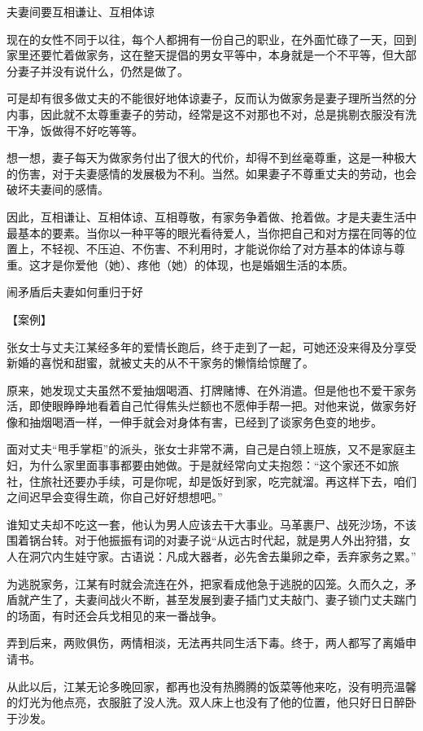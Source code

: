\documentclass[12pt,UTF8]{ctexbook}
\begin{document}
夫妻间要互相谦让、互相体谅


现在的女性不同于以往，每个人都拥有一份自己的职业，在外面忙碌了一天，回到家里还要忙着做家务，这在整天提倡的男女平等中，本身就是一个不平等，但大部分妻子并没有说什么，仍然是做了。

可是却有很多做丈夫的不能很好地体谅妻子，反而认为做家务是妻子理所当然的分内事，因此就不太尊重妻子的劳动，经常是这不对那也不对，总是挑剔衣服没有洗干净，饭做得不好吃等等。

想一想，妻子每天为做家务付出了很大的代价，却得不到丝毫尊重，这是一种极大的伤害，对于夫妻感情的发展极为不利。当然。如果妻子不尊重丈夫的劳动，也会破坏夫妻间的感情。

因此，互相谦让、互相体谅、互相尊敬，有家务争着做、抢着做。才是夫妻生活中最基本的要素。当你以一种平等的眼光看待爱人，当你把自己和对方摆在同等的位置上，不轻视、不压迫、不伤害、不利用时，才能说你给了对方基本的体谅与尊重。这才是你爱他（她）、疼他（她）的体现，也是婚姻生活的本质。





闹矛盾后夫妻如何重归于好


【案例】

张女士与丈夫江某经多年的爱情长跑后，终于走到了一起，可她还没来得及分享受新婚的喜悦和甜蜜，就被丈夫的从不干家务的懒惰给惊醒了。

原来，她发现丈夫虽然不爱抽烟喝酒、打牌赌博、在外消遣。但是他也不爱干家务活，即使眼睁睁地看着自己忙得焦头烂额也不愿伸手帮一把。对他来说，做家务好像和抽烟喝酒一样，一伸手就会对身体有害，已经到了谈家务色变的地步。

面对丈夫“甩手掌柜”的派头，张女士非常不满，自己是白领上班族，又不是家庭主妇，为什么家里面事事都要由她做。于是就经常向丈夫抱怨：“这个家还不如旅社，住旅社还要办手续，可是你呢，却是饭好到家，吃完就溜。再这样下去，咱们之间迟早会变得生疏，你自己好好想想吧。”

谁知丈夫却不吃这一套，他认为男人应该去干大事业。马革裹尸、战死沙场，不该围着锅台转。对于他振振有词的对妻子说“从远古时代起，就是男人外出狩猎，女人在洞穴内生娃守家。古语说：凡成大器者，必先舍去巢卵之牵，丢弃家务之累。”

为逃脱家务，江某有时就会流连在外，把家看成他急于逃脱的囚笼。久而久之，矛盾就产生了，夫妻间战火不断，甚至发展到妻子插门丈夫敲门、妻子锁门丈夫踹门的场面，有时还会兵戈相见的来一番战争。

弄到后来，两败俱伤，两情相淡，无法再共同生活下毒。终于，两人都写了离婚申请书。

从此以后，江某无论多晚回家，都再也没有热腾腾的饭菜等他来吃，没有明亮温馨的灯光为他点亮，衣服脏了没人洗。双人床上也没有了他的位置，他只好日日醉卧于沙发。
\end{document}
